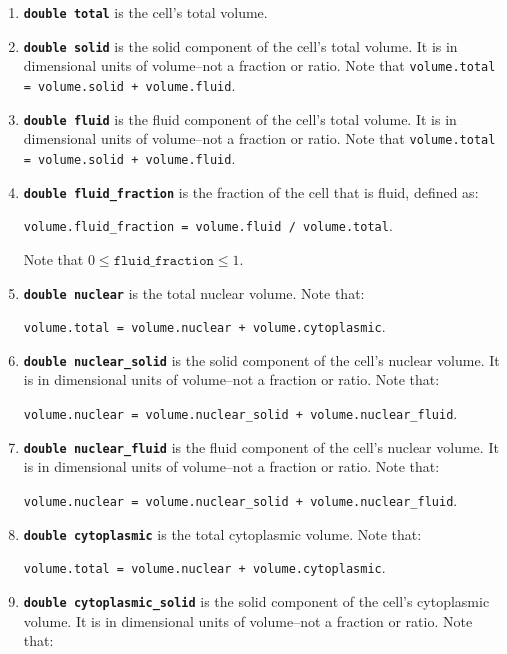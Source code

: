 \documentclass[12pt]{article}
\renewcommand{\v}{\verb}
\newcommand{\smallcode}[1]{\textbf{\texttt{#1}}}
\begin{document}
\begin{enumerate}
\item 
\smallcode{double total} is the cell's total volume. 

\item 
\smallcode{double solid} is the solid component of the cell's total volume. It is in dimensional units 
of volume--not a fraction or ratio. Note that \v|volume.total = volume.solid + volume.fluid|.

\item 
\smallcode{double fluid} is the fluid component of the cell's total volume. It is in dimensional units 
of volume--not a fraction or ratio. Note that \v|volume.total = volume.solid + volume.fluid|.

\item 
\smallcode{double fluid\_fraction} is the fraction of the cell that is fluid, defined as:
 
\verb|volume.fluid_fraction = volume.fluid / volume.total|.  

Note that $0 \le \texttt{fluid\_fraction} \le 1.$

\item 
\smallcode{double nuclear} is the total nuclear volume. Note that: 
 
\v|volume.total = volume.nuclear + volume.cytoplasmic|. 

\item 
\smallcode{double nuclear\_solid} is the solid component of the cell's nuclear volume. It is in dimensional units 
of volume--not a fraction or ratio. Note that:

\v|volume.nuclear = volume.nuclear_solid + volume.nuclear_fluid|.

\item 
\smallcode{double nuclear\_fluid} is the fluid component of the cell's nuclear volume. It is in dimensional units 
of volume--not a fraction or ratio. Note that: 

\v|volume.nuclear = volume.nuclear_solid + volume.nuclear_fluid|.

\item 
\smallcode{double cytoplasmic} is the total cytoplasmic volume. Note that: 

\v|volume.total = volume.nuclear + volume.cytoplasmic|. 

\item 
\smallcode{double cytoplasmic\_solid} is the solid component of the cell's cytoplasmic volume. It is in dimensional units 
of volume--not a fraction or ratio. Note that: 


\end{enumerate}
\end{document}
